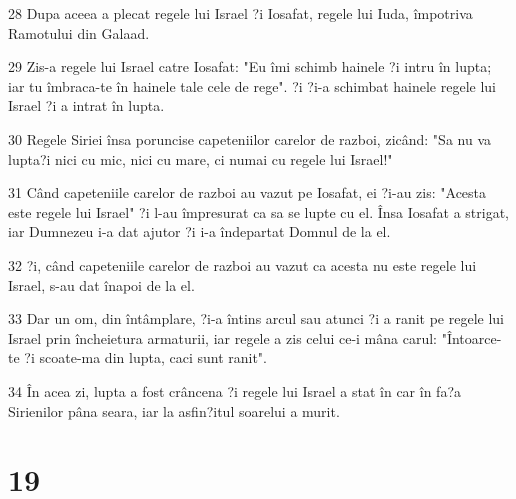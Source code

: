 \par 28 Dupa aceea a plecat regele lui Israel ?i Iosafat, regele lui Iuda, împotriva Ramotului din Galaad.
\par 29 Zis-a regele lui Israel catre Iosafat: "Eu îmi schimb hainele ?i intru în lupta; iar tu îmbraca-te în hainele tale cele de rege". ?i ?i-a schimbat hainele regele lui Israel ?i a intrat în lupta.
\par 30 Regele Siriei însa poruncise capeteniilor carelor de razboi, zicând: "Sa nu va lupta?i nici cu mic, nici cu mare, ci numai cu regele lui Israel!"
\par 31 Când capeteniile carelor de razboi au vazut pe Iosafat, ei ?i-au zis: "Acesta este regele lui Israel" ?i l-au împresurat ca sa se lupte cu el. Însa Iosafat a strigat, iar Dumnezeu i-a dat ajutor ?i i-a îndepartat Domnul de la el.
\par 32 ?i, când capeteniile carelor de razboi au vazut ca acesta nu este regele lui Israel, s-au dat înapoi de la el.
\par 33 Dar un om, din întâmplare, ?i-a întins arcul sau atunci ?i a ranit pe regele lui Israel prin încheietura armaturii, iar regele a zis celui ce-i mâna carul: "Întoarce-te ?i scoate-ma din lupta, caci sunt ranit".
\par 34 În acea zi, lupta a fost crâncena ?i regele lui Israel a stat în car în fa?a Sirienilor pâna seara, iar la asfin?itul soarelui a murit.

\chapter{19}

